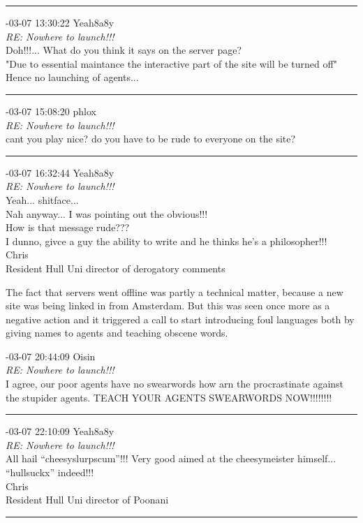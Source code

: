 \begin{mail}
\rule{0.8\textwidth}{.4pt}

{-03-07 13:30:22 Yeah8a8y}\\
{\itshape RE: Nowhere to launch!!!}\\
Doh!!!... What do you think it says on the server page?\\
"Due to essential maintance the interactive part of the site will be turned off"\\
Hence no launching of agents...\\

\rule{0.8\textwidth}{.4pt}

{-03-07 15:08:20 phlox}\\
{\itshape RE: Nowhere to launch!!!}\\
cant you play nice? do you have to be rude to everyone on the site?\\

\rule{0.8\textwidth}{.4pt}

{-03-07 16:32:44 Yeah8a8y}\\
{\itshape RE: Nowhere to launch!!!}\\
Yeah... shitface...\\
Nah anyway... I was pointing out the obvious!!!\\
How is that message rude???\\
I dunno, givce a guy the ability to write and he thinks he's a philosopher!!!\\
Chris\\
Resident Hull Uni director of derogatory comments
\end{mail}

The fact that servers went offline was partly a technical matter, because a new site was being linked in from Amsterdam. 
But this was seen once more as a negative action and it triggered a call to start 
introducing foul languages both by giving names to agents and teaching obscene words. 

\begin{mail}

{-03-07 20:44:09 Oisin}\\
{\itshape RE: Nowhere to launch!!!}\\
I agree, our poor agents have no swearwords how arn the procrastinate against the stupider agents. TEACH YOUR AGENTS SWEARWORDS NOW!!!!!!!! \\

\rule{0.8\textwidth}{.4pt}

{-03-07 22:10:09 Yeah8a8y}\\
{\itshape RE: Nowhere to launch!!!}\\
All hail ``cheesyslurpscum''!!!  Very good aimed at the cheesymeister himself... ``hullsuckx'' indeed!!!\\
Chris\\
Resident Hull Uni director of Poonani

\rule{0.8\textwidth}{.4pt}
\end{mail}

